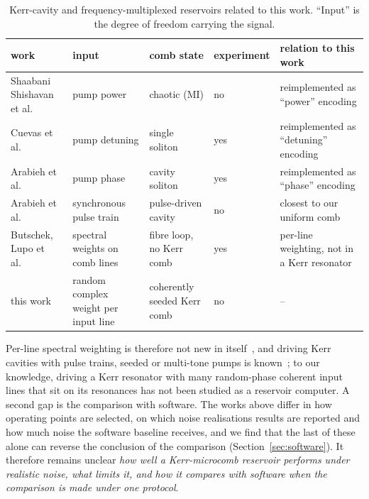 \begin{table}[htbp]
\centering
\caption{Kerr-cavity and frequency-multiplexed reservoirs related to this work. ``Input'' is the degree of freedom carrying the signal.}
\label{tab:related}
\footnotesize
\begin{tabular}{p{3.3cm}p{2.9cm}p{2.6cm}p{1.6cm}p{3.6cm}}
\toprule
work & input & comb state & experiment & relation to this work \\
\midrule
Shaabani Shishavan et al.~\cite{shishavan2025} & pump power & chaotic (MI) & no & reimplemented as ``power'' encoding \\
Cuevas et al.~\cite{cuevas2025} & pump detuning & single soliton & yes & reimplemented as ``detuning'' encoding \\
Arabieh et al.~\cite{arabieh2026soliton} & pump phase & cavity soliton & yes & reimplemented as ``phase'' encoding \\
Arabieh et al.~\cite{arabieh2026pulse} & synchronous pulse train & pulse-driven cavity & no & closest to our uniform comb \\
Butschek, Lupo et al.~\cite{butschek2020,lupo2021,lupo2023} & spectral weights on comb lines & fibre loop, no Kerr comb & yes & per-line weighting, not in a Kerr resonator \\
this work & random complex weight per input line & coherently seeded Kerr comb & no & -- \\
\bottomrule
\end{tabular}
\end{table}

Per-line spectral weighting is therefore not new in itself~\cite{butschek2020,lupo2021}, and driving Kerr cavities with pulse
trains, seeded or multi-tone pumps is known~\cite{obrzud2017,papp2013,hansson2014}; to our knowledge, driving a Kerr resonator with many random-phase coherent input lines
that sit on its resonances has not been studied as a reservoir computer. A second gap is the comparison with software. The works
above differ in how operating points are selected, on which noise realisations results are reported and how much noise the software
baseline receives, and we find that the last of these alone can reverse the conclusion of the comparison
(Section~\ref{sec:software}). It therefore remains unclear \emph{how well a Kerr-microcomb reservoir performs under realistic noise, what limits it, and how it compares with
software when the comparison is made under one protocol}.

